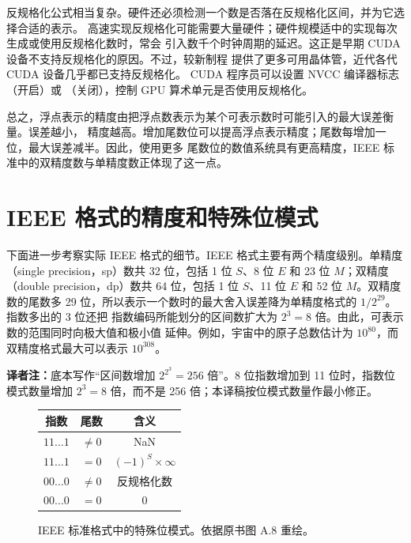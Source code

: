 反规格化公式相当复杂。硬件还必须检测一个数是否落在反规格化区间，并为它选择合适的表示。
高速实现反规格化可能需要大量硬件；硬件规模适中的实现每次生成或使用反规格化数时，常会
引入数千个时钟周期的延迟。这正是早期 CUDA 设备不支持反规格化的原因。不过，较新制程
提供了更多可用晶体管，近代各代 CUDA 设备几乎都已支持反规格化\cite{appa-cuda-fp}。
CUDA 程序员可以设置 NVCC 编译器标志 （开启）或 
（关闭），控制 GPU 算术单元是否使用反规格化。

总之，浮点表示的精度由把浮点数表示为某个可表示数时可能引入的最大误差衡量。误差越小，
精度越高。增加尾数位可以提高浮点表示精度；尾数每增加一位，最大误差减半。因此，使用更多
尾数位的数值系统具有更高精度，IEEE 标准中的双精度数与单精度数正体现了这一点。

\section{IEEE 格式的精度和特殊位模式}
\label{sec:appa-ieee-precision}

下面进一步考察实际 IEEE 格式的细节。IEEE 格式主要有两个精度级别。单精度（single
precision，sp）数共 32 位，包括 1 位 $S$、8 位 $E$ 和 23 位 $M$；双精度（double
precision，dp）数共 64 位，包括 1 位 $S$、11 位 $E$ 和 52 位 $M$。双精度数的尾数多
29 位，所以表示一个数时的最大舍入误差降为单精度格式的 $1/2^{29}$。指数多出的 3 位还把
指数编码所能划分的区间数扩大为 $2^3=8$ 倍。由此，可表示数的范围同时向极大值和极小值
延伸。例如，宇宙中的原子总数估计为 $10^{80}$，而双精度格式最大可以表示 $10^{308}$。

\noindent\textbf{译者注：}底本写作“区间数增加 $2^{2^3}=256$ 倍”。8 位指数增加到
11 位时，指数位模式数量增加 $2^3=8$ 倍，而不是 256 倍；本译稿按位模式数量作最小修正。

\begin{figure}[htbp]
  \centering
  \small
  \begin{tabular}{ccc}
    \hline
    \textbf{指数} & \textbf{尾数} & \textbf{含义}\\
    \hline
    $11\ldots1$ & $\ne0$ & NaN\\
    $11\ldots1$ & $=0$ & $(-1)^S\times\infty$\\
    $00\ldots0$ & $\ne0$ & 反规格化数\\
    $00\ldots0$ & $=0$ & 0\\
    \hline
  \end{tabular}
  \caption{IEEE 标准格式中的特殊位模式。依据原书图 A.8 重绘。}
  \label{fig:a-8}
\end{figure}

